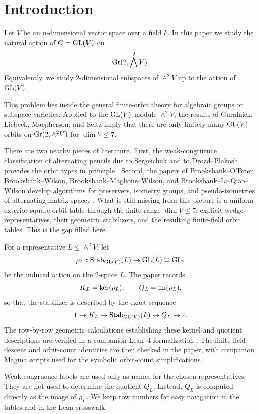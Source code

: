 \section{Introduction}

Let \(V\) be an \(n\)-dimensional vector space over a field \(k\). In this
paper we study the natural action of \(G=\mathrm{GL}(V)\) on
\[
  \mathrm{Gr}(2,\bigwedge^{2} V).
\]
Equivalently, we study \(2\)-dimensional subspaces of \(\wedge^2 V\) up to the
action of \(\mathrm{GL}(V)\).

This problem lies inside the general finite-orbit theory for algebraic groups
on subspace varieties. Applied to the \(\mathrm{GL}(V)\)-module \(\wedge^2 V\), the
results of Guralnick, Liebeck, Macpherson, and Seitz \cite{GLMS1997} imply that
there are only finitely many \(\mathrm{GL}(V)\)-orbits on \(\mathrm{Gr}(2,\wedge^2 V)\) for
\(\dim V\le 7\).

There are two nearby pieces of literature. First, the weak-congruence
classification of alternating pencils due to Sergeichuk and to
Drozd--Plakosh provides the orbit types in principle
\cite{Sergeichuk2010,DrozdPlakosh2014,DrozdPlakosh2016}. Second, the papers of
Brooksbank--O'Brien, Brooksbank--Wilson, Brooksbank--Maglione--Wilson, and
Brooksbank--Li--Qiao--Wilson develop algorithms for preservers, isometry
groups, and pseudo-isometries of alternating matrix spaces
\cite{BrooksbankObrien2008,BrooksbankWilson2012,BrooksbankMaglioneWilson2017,BrooksbankLiQiaoWilson2020}.
What is still missing from this picture is a uniform exterior-square orbit
table through the finite range \(\dim V\le 7\): explicit wedge representatives,
their geometric stabilizers, and the resulting finite-field orbit tables. This
is the gap filled here.

For a representative \(L\le \wedge^2 V\), let
\[
  \rho_L:\mathrm{Stab}_{\mathrm{GL}(V)}(L)\to \mathrm{GL}(L)\cong \mathrm{GL}_2
\]
be the induced action on the \(2\)-space \(L\). The paper records
\[
  K_L=\ker(\rho_L),
  \qquad
  Q_L=\mathrm{im}(\rho_L),
\]
so that the stabilizer is described by the exact sequence
\[
  1\to K_L\to \mathrm{Stab}_{\mathrm{GL}(V)}(L)\to Q_L\to 1.
\]
The row-by-row geometric calculations establishing these kernel and quotient
descriptions are verified in a companion Lean~4 formalization
\cite{RizzoliWedge2Formalization2026}. The finite-field descent and orbit-count
identities are then checked in the paper, with companion Magma scripts used for
the symbolic orbit-count simplifications.

Weak-congruence labels are used only as names for the chosen representatives.
They are not used to determine the quotient \(Q_L\). Instead, \(Q_L\) is
computed directly as the image of \(\rho_L\). We keep row numbers for easy
navigation in the tables and in the Lean crosswalk.

